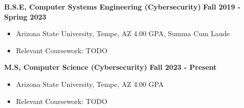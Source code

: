 \textbf{B.S.E, Computer Systems Engineering (Cybersecurity)} \hfill \textbf{Fall 2019 - Spring 2023}
\begin{itemize}
    \setlength{\itemsep}{0pt} %
    \setlength{\parskip}{0pt} %
    \item{Arizona State University, Tempe, AZ \hfill 4.00 GPA, Summa Cum Laude}
    \item{Relevant Coursework: TODO}
\end{itemize}

\vspace{0.3em}

\textbf{M.S, Computer Science (Cybersecurity)} \hfill \textbf{Fall 2023 - Present}
\begin{itemize}
    \setlength{\itemsep}{0pt} %
    \setlength{\parskip}{0pt} %
    \item{Arizona State University, Tempe, AZ \hfill 4.00 GPA}
    \item{Relevant Coursework: TODO}
\end{itemize}
